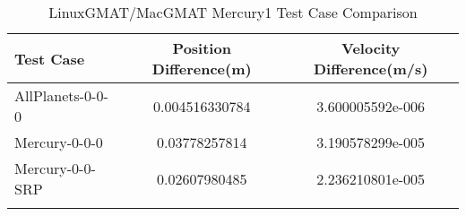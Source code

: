 \begin{table}[htbp!]
\centering
\caption{ LinuxGMAT/MacGMAT Mercury1 Test Case Comparison}
      \begin{tabular}{lcc}
      \hline\hline
          Test Case & Position Difference(m) & Velocity Difference(m/s) \\
         \hline
         AllPlanets-0-0-0 & 0.004516330784 & 3.600005592e-006 \\
         Mercury-0-0-0 & 0.03778257814 & 3.190578299e-005 \\
         Mercury-0-0-SRP & 0.02607980485 & 2.236210801e-005 \\
      \hline\hline
      \label{Table: Mercury1 LinuxGMAT-MacGMAT Table} 
\end{tabular}
\end{table}
